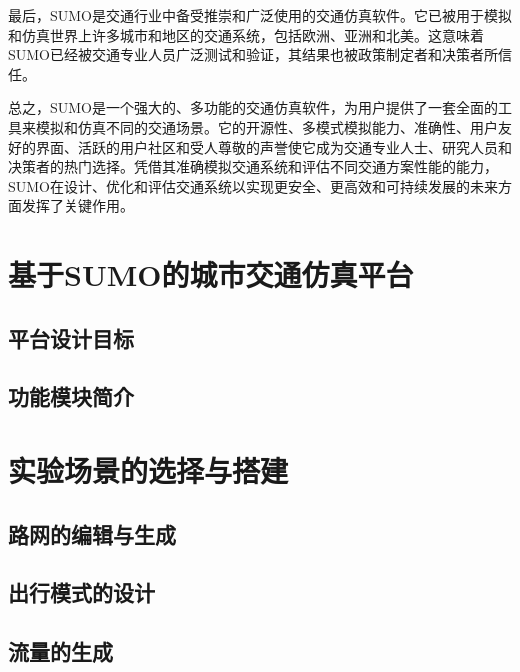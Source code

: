 最后，SUMO是交通行业中备受推崇和广泛使用的交通仿真软件。它已被用于模拟和仿真世界上许多城市和地区的交通系统，包括欧洲、亚洲和北美。这意味着SUMO已经被交通专业人员广泛测试和验证，其结果也被政策制定者和决策者所信任。

总之，SUMO是一个强大的、多功能的交通仿真软件，为用户提供了一套全面的工具来模拟和仿真不同的交通场景。它的开源性、多模式模拟能力、准确性、用户友好的界面、活跃的用户社区和受人尊敬的声誉使它成为交通专业人士、研究人员和决策者的热门选择。凭借其准确模拟交通系统和评估不同交通方案性能的能力，SUMO在设计、优化和评估交通系统以实现更安全、更高效和可持续发展的未来方面发挥了关键作用。

\section{基于SUMO的城市交通仿真平台}

\subsection{平台设计目标}

\subsection{功能模块简介}

\section{实验场景的选择与搭建}

\subsection{路网的编辑与生成}

\subsection{出行模式的设计}

\subsection{流量的生成}